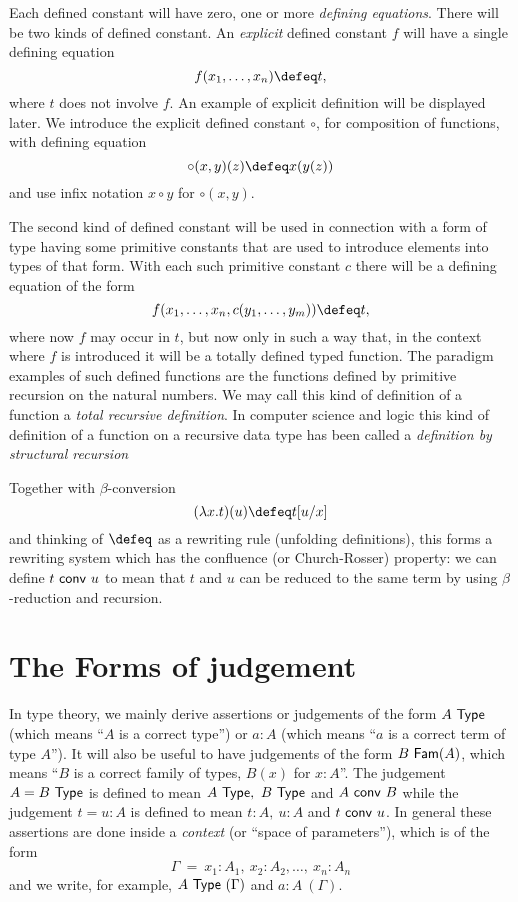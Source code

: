 {\medskip

 Each defined constant will have zero, one or more {\em defining equations}.  There will be two kinds of defined constant.  An {\em explicit} defined constant $f$ will have a single defining equation
  \[ f(x_1,\dots,x_n)\defeq t,\]
where $t$ does not involve $f$.  An example of explicit definition will be displayed later.  We introduce the explicit defined constant 
$\circ$, for composition of functions, with defining equation
  \[ \circ (x,y)(z) \defeq x(y(z))\]
and use infix notation $x\circ y$ for $\circ(x,y)$.



The second kind of defined constant will be used in connection with a form of type having some primitive constants that are used to introduce elements into types of that form.  With each such primitive constant $c$ there will be a defining equation of the form
$$
f(x_1,\dots,x_n,c(y_1,\dots,y_m)) \defeq t,
$$
where now $f$ may occur in $t$, but now only in such a way that, in the context where $f$ is introduced it will be a totally defined typed function.
The paradigm examples of such defined functions are the functions defined by primitive recursion on the natural numbers.  We may call this kind of definition of a function a {\em total recursive definition}.  In computer science and logic this kind of definition of a function on a recursive data type has been called a {\em definition by structural recursion}

Together with $\beta$-conversion
$$
(\lambda x.t)(u) \defeq t[u/x]
$$
and thinking of $\defeq$ as a rewriting rule (unfolding definitions),
this forms a rewriting system which has the confluence (or Church-Rosser) property: we can
define $t ~{\sf conv}~ u$ to mean that $t$ and $u$ can be reduced to the same term by using
$\beta$-reduction and recursion.

\section*{The Forms of judgement}

 In type theory, we mainly derive assertions or judgements of the form $A~{\sf Type}$ (which means ``$A$ is a correct type'') or $a:A$ (which means ``$a$ is a correct term of type $A$'').  It will also be useful to have judgements of the form $B~{\sf Fam}(A)$,
which means ``$B$ is a correct family of types, $B(x)$ for $x:A$''.
The judgement $A=B~{\sf Type}$ is defined to mean $A~{\sf Type},~B~{\sf Type}$ and $A~{\sf conv}~ B$
while the judgement $t=u:A$ is defined to mean $t:A,~u:A$ and $t~{\sf conv}~ u$.
In general
these assertions are done inside a {\em context} (or ``space of parameters''), which is of
the form
$$
\Gamma ~=~  x_1:A_1,~x_2:A_2,\dots,~x_n:A_n
$$
and we write, for example, $A~{\sf Type}~(\Gamma)$ and $a:A~(\Gamma)$. 

}
